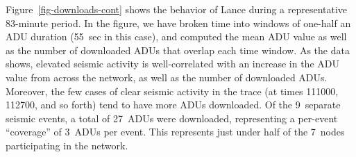 Figure~\ref{fig-downloads-cont} shows the behavior of Lance during a
representative 83-minute period. In the figure, we have broken time
into windows of one-half an ADU duration (55~sec in this case), and
computed the mean ADU value as well as the number of downloaded
ADUs that overlap each time window. As the data shows, elevated seismic
activity is well-correlated with an increase in the ADU value
from across the network, as well as the number of downloaded ADUs.
Moreover, the few cases of clear seismic activity in the trace 
(at times 111000, 112700, and so forth) tend to have more ADUs
downloaded. Of the 9~separate seismic events, a total of 27~ADUs were
downloaded, representing a per-event ``coverage'' of 3~ADUs per event.
This represents just under half of the 7~nodes participating in the network.





